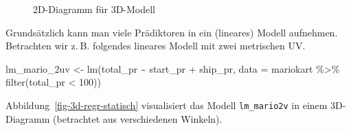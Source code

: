 \documentclass[
  letterpaper,
  oneside,
  open=any]{scrbook}
\newenvironment{Shaded}{\begin{snugshade}}{\end{snugshade}}
\newcommand{\AttributeTok}[1]{\textcolor[rgb]{0.40,0.45,0.13}{#1}}
\newcommand{\DecValTok}[1]{\textcolor[rgb]{0.68,0.00,0.00}{#1}}
\newcommand{\FunctionTok}[1]{\textcolor[rgb]{0.28,0.35,0.67}{#1}}
\newcommand{\NormalTok}[1]{\textcolor[rgb]{0.00,0.23,0.31}{#1}}
\newcommand{\OtherTok}[1]{\textcolor[rgb]{0.00,0.23,0.31}{#1}}
\newcommand{\SpecialCharTok}[1]{\textcolor[rgb]{0.37,0.37,0.37}{#1}}
\theoremstyle{definition}
\theoremstyle{definition}
\theoremstyle{definition}
\theoremstyle{remark}
\begin{document}
\begin{figure}


\caption{\label{fig-3d-regr-2d}2D-Diagramm für 3D-Modell}

\end{figure}%

Grundsätzlich kann man viele Prädiktoren in ein (lineares) Modell
aufnehmen. Betrachten wir z. B. folgendes lineares Modell mit zwei
metrischen UV.

\begin{Shaded}
\begin{Highlighting}[]
\NormalTok{lm\_mario\_2uv }\OtherTok{\textless{}{-}} \FunctionTok{lm}\NormalTok{(total\_pr }\SpecialCharTok{\textasciitilde{}}\NormalTok{ start\_pr }\SpecialCharTok{+}\NormalTok{ ship\_pr, }\AttributeTok{data =}\NormalTok{ mariokart }\SpecialCharTok{\%\textgreater{}\%} \FunctionTok{filter}\NormalTok{(total\_pr }\SpecialCharTok{\textless{}} \DecValTok{100}\NormalTok{))}
\end{Highlighting}
\end{Shaded}

Abbildung~\ref{fig-3d-regr-statisch} visualisiert das Modell
\texttt{lm\_mario2v} in einem 3D-Diagramm (betrachtet aus verschiedenen
Winkeln).
\end{document}
